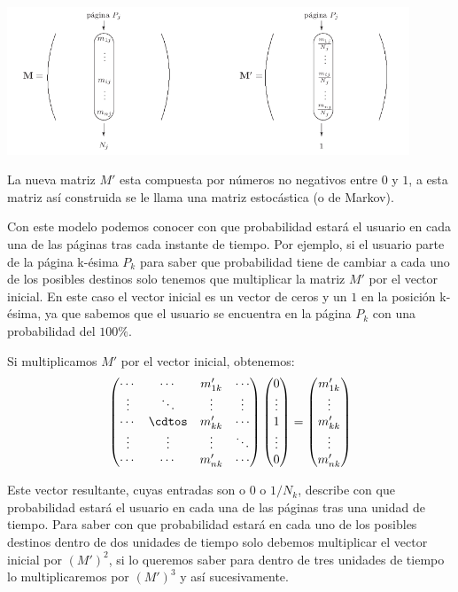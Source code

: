 \documentclass[size=a4, parskip=half, titlepage=false, toc=flat, toc=bib, 12pt]{scrartcl}
\theoremstyle{theorem-style}
\theoremstyle{definition-style}
\theoremstyle{remark-style}
\theoremstyle{example-style}
\theoremstyle{definition-style}
\theoremstyle{remark-style}
\begin{document}
\begin{center}
\includegraphics[width=0.9\textwidth]{./img/markov}
\end{center}

La nueva matriz $M'$ esta compuesta por números no negativos entre $0$ y $1$, a esta matriz así construida se le llama una matriz estocástica (o de Markov).

Con este modelo podemos conocer con que probabilidad estará el usuario en cada una de las páginas tras cada instante de tiempo. Por ejemplo, si el usuario parte de la página k-ésima $P_k$ para saber que probabilidad tiene de cambiar a cada uno de los posibles destinos solo tenemos que multiplicar la matriz $M'$ por el vector inicial. En este caso el vector inicial es un vector de ceros y un $1$ en la posición k-ésima, ya que sabemos que el usuario se encuentra en la página $P_k$ con una probabilidad del $100\%$.

Si multiplicamos $M'$ por el vector inicial, obtenemos:
$$\begin{pmatrix}
\cdots & \cdots & m'_{1k} & \cdots \\
\vdots & \ddots & \vdots & \vdots \\
\cdots & \cdtos & m'_{kk} & \cdots \\
\vdots & \vdots & \vdots & \ddots \\
\cdots & \cdots & m'_{nk} & \cdots \end{pmatrix} \begin{pmatrix}
0 \\
\vdots \\
1 \\
\vdots \\
0 \end{pmatrix} = \begin{pmatrix}
m'_{1k}\\
\vdots \\
m'_{kk} \\
\vdots \\
m'_{nk} \end{pmatrix}$$

Este vector resultante, cuyas entradas son o $0$ o $1/N_k$, describe con que probabilidad estará el usuario en cada una de las páginas tras una unidad de tiempo. Para saber con que probabilidad estará en cada uno de los posibles destinos dentro de dos unidades de tiempo solo debemos multiplicar el vector inicial por $(M')^2$, si lo queremos saber para dentro de tres unidades de tiempo lo multiplicaremos por $(M')^3$ y así sucesivamente.
\end{document}
